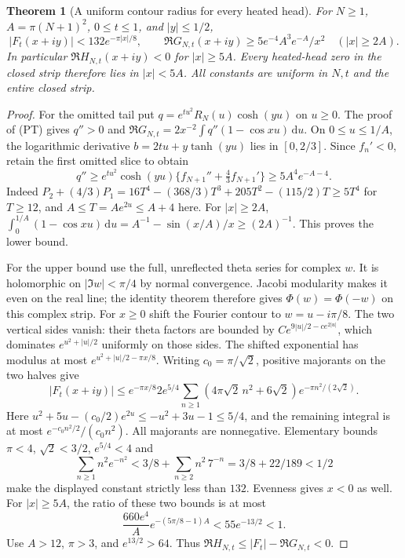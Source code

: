 \documentclass[11pt]{article}
\newtheorem{theorem}{Theorem}
\theoremstyle{remark}\newtheorem{remark}[theorem]{Remark}
\newcommand{\dd}{\,\mathrm d}
\begin{document}
\begin{theorem}[A uniform contour radius for every heated head]
\label{thm:heated-head-radius}
For $N\ge1$, $A=\pi(N+1)^2$, $0\le t\le1$, and $|y|\le1/2$,
\[
 |F_t(x+iy)|<132e^{-\pi|x|/8},\qquad
 \Re G_{N,t}(x+iy)\ge
       5e^{-4}A^3e^{-A}/x^2\quad(|x|\ge2A).              \tag{WR}
\]
In particular $\Re H_{N,t}(x+iy)<0$ for $|x|\ge5A$.
Every heated-head zero in the closed strip therefore lies in $|x|<5A$.
All constants are uniform in $N,t$ and the entire closed strip.
\end{theorem}
\begin{proof}
For the omitted tail put $q=e^{tu^2}R_N(u)\cosh(yu)$ on $u\ge0$.
The proof of (PT) gives $q''>0$ and
$\Re G_{N,t}=2x^{-2}\int q''(1-\cos xu)\dd u$.
On $0\le u\le1/A$, the logarithmic derivative
$b=2tu+y\tanh(yu)$ lies in $[0,2/3]$.
Since $f_n'<0$, retain the first omitted slice to obtain
\[
 q''\ge e^{tu^2}\cosh(yu)\{f_{N+1}''+\tfrac43f_{N+1}'\}
       \ge5A^4e^{-A-4}.
\]
Indeed $P_2+(4/3)P_1
=16T^4-(368/3)T^3+205T^2-(115/2)T\ge5T^4$ for $T\ge12$,
and $A\le T=Ae^{2u}\le A+4$ here.
For $|x|\ge2A$,
$\int_0^{1/A}(1-\cos xu)\dd u
=A^{-1}-\sin(x/A)/x\ge(2A)^{-1}$.
This proves the lower bound.

For the upper bound use the full, unreflected theta series for complex $w$.
It is holomorphic on $|\Im w|<\pi/4$ by normal convergence.
Jacobi modularity makes it even on the real line; the identity
theorem therefore gives $\Phi(w)=\Phi(-w)$ on this complex strip.
For $x\ge0$ shift the Fourier contour to $w=u-i\pi/8$.
The two vertical sides vanish: their theta factors are bounded by
$C e^{9|u|/2-c e^{2|u|}}$, which dominates
$e^{u^2+|u|/2}$ uniformly on those sides.
The shifted exponential has modulus at most
$e^{u^2+|u|/2-\pi x/8}$.
Writing $c_0=\pi/\sqrt2$, positive majorants on the two halves give
\[
 |F_t(x+iy)|\le e^{-\pi x/8}
 2e^{5/4}\sum_{n\ge1}(4\pi\sqrt2\,n^2+6\sqrt2)
                         e^{-\pi n^2/(2\sqrt2)} .
\]
Here $u^2+5u-(c_0/2)e^{2u}\le-u^2+3u-1\le5/4$,
and the remaining integral is at most
$e^{-c_0n^2/2}/(c_0n^2)$. All majorants are nonnegative.
Elementary bounds $\pi<4$, $\sqrt2<3/2$, $e^{5/4}<4$ and
\[
 \sum_{n\ge1}n^2e^{-n^2}
 <3/8+\sum_{n\ge2}n^2\,7^{-n}
 =3/8+22/189<1/2
\]
make the displayed constant strictly less than $132$.
Evenness gives $x<0$ as well.
For $|x|\ge5A$, the ratio of these two bounds is at most
\[
 \frac{660e^4}{A}e^{-(5\pi/8-1)A}<55e^{-13/2}<1.
\]
Use $A>12$, $\pi>3$, and $e^{13/2}>64$.
Thus $\Re H_{N,t}\le|F_t|-\Re G_{N,t}<0$.
\end{proof}
\end{document}
